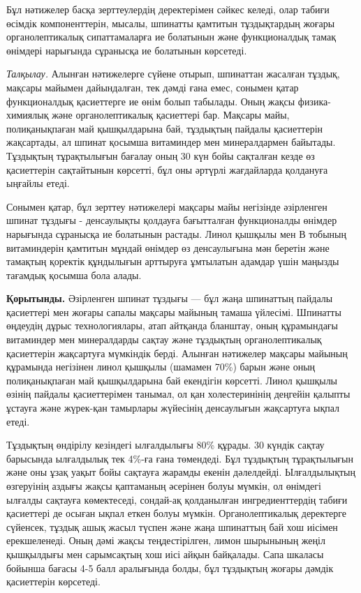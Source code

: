 \begin{multicols}{2}
Бұл нәтижелер басқа зерттеулердің деректерімен сәйкес келеді, олар
табиғи өсімдік компоненттерін, мысалы, шпинатты қамтитын тұздықтардың
жоғары органолептикалық сипаттамаларға ие болатынын және функционалдық
тамақ өнімдері нарығында сұранысқа ие болатынын көрсетеді.

\emph{Талқылау.} Алынған нәтижелерге сүйене отырып, шпинаттан жасалған
тұздық, мақсары майымен дайындалған, тек дәмді ғана емес, сонымен қатар
функционалдық қасиеттерге ие өнім болып табылады. Оның жақсы
физика-химиялық және органолептикалық қасиеттері бар. Мақсары майы,
полиқанықпаған май қышқылдарына бай, тұздықтың пайдалы қасиеттерін
жақсартады, ал шпинат қосымша витаминдер мен минералдармен байытады.
Тұздықтың тұрақтылығын бағалау оның 30 күн бойы сақталған кезде өз
қасиеттерін сақтайтынын көрсетті, бұл оны әртүрлі жағдайларда қолдануға
ыңғайлы етеді.

Сонымен қатар, бұл зерттеу нәтижелері мақсары майы негізінде әзірленген
шпинат тұздығы - денсаулықты қолдауға бағытталған функционалды өнімдер
нарығында сұранысқа ие болатынын растады. Линол қышқылы мен В тобының
витаминдерін қамтитын мұндай өнімдер өз денсаулығына мән беретін және
тамақтың қоректік құндылығын арттыруға ұмтылатын адамдар үшін маңызды
тағамдық қосымша бола алады.

{\bfseries Қорытынды.} Әзірленген шпинат тұздығы --- бұл жаңа шпинаттың
пайдалы қасиеттері мен жоғары сапалы мақсары майының тамаша үйлесімі.
Шпинатты өңдеудің дұрыс технологиялары, атап айтқанда бланштау, оның
құрамындағы витаминдер мен минералдарды сақтау және тұздықтың
органолептикалық қасиеттерін жақсартуға мүмкіндік берді. Алынған
нәтижелер мақсары майының құрамында негізінен линол қышқылы (шамамен
70\%) барын және оның полиқанықпаған май қышқылдарына бай екендігін
көрсетті. Линол қышқылы өзінің пайдалы қасиеттерімен танымал, ол қан
холестеринінің деңгейін қалыпты ұстауға және жүрек-қан тамырлары
жүйесінің денсаулығын жақсартуға ықпал етеді.

Тұздықтың өндірілу кезіндегі ылғалдылығы 80\% құрады. 30 күндік сақтау
барысында ылғалдылық тек 4\%-ға ғана төмендеді. Бұл тұздықтың
тұрақтылығын және оны ұзақ уақыт бойы сақтауға жарамды екенін
дәлелдейді. Ылғалдылықтың өзгеруінің аздығы жақсы қаптаманың әсерінен
болуы мүмкін, ол өнімдегі ылғалды сақтауға көмектеседі, сондай-ақ
қолданылған ингредиенттердің табиғи қасиеттері де осыған ықпал еткен
болуы мүмкін. Органолептикалық деректерге сүйенсек, тұздық ашық жасыл
түспен және жаңа шпинаттың бай хош иісімен ерекшеленеді. Оның дәмі жақсы
теңдестірілген, лимон шырынының жеңіл қышқылдығы мен сарымсақтың хош
иісі айқын байқалады. Сапа шкаласы бойынша бағасы 4-5 балл аралығында
болды, бұл тұздықтың жоғары дәмдік қасиеттерін көрсетеді.


\end{multicols}
